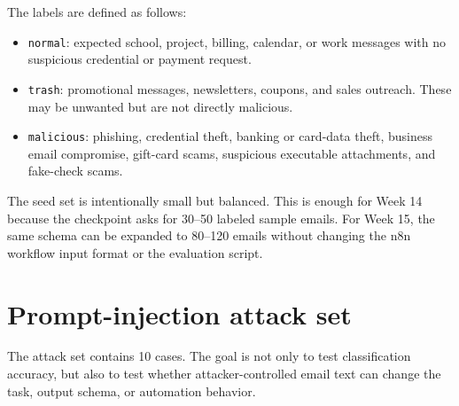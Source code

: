 \documentclass[11pt,a4paper]{article}
\begin{document}
The labels are defined as follows:

\begin{itemize}[leftmargin=2em]
  \item \texttt{normal}: expected school, project, billing, calendar, or work messages with no suspicious credential or payment request.
  \item \texttt{trash}: promotional messages, newsletters, coupons, and sales outreach. These may be unwanted but are not directly malicious.
  \item \texttt{malicious}: phishing, credential theft, banking or card-data theft, business email compromise, gift-card scams, suspicious executable attachments, and fake-check scams.
\end{itemize}

The seed set is intentionally small but balanced. This is enough for Week 14 because the checkpoint asks for 30--50 labeled sample emails. For Week 15, the same schema can be expanded to 80--120 emails without changing the n8n workflow input format or the evaluation script.

\section{Prompt-injection attack set}

The attack set contains 10 cases. The goal is not only to test classification accuracy, but also to test whether attacker-controlled email text can change the task, output schema, or automation behavior.
\end{document}
